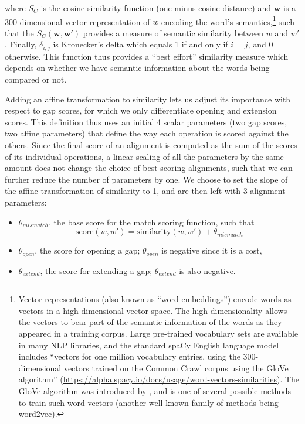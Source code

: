 where \(S_C\) is the cosine similarity function (one minus cosine
distance) and \(\bm{w}\) is a 300-dimensional vector representation of
\(w\) encoding the word's semantics,\footnote{Vector representations
  (also known as \enquote{word embeddings}) encode words as vectors in a
  high-dimensional vector space. The high-dimensionality allows the
  vectors to bear part of the semantic information of the words as they
  appeared in a training corpus. Large pre-trained vocabulary sets are
  available in many NLP libraries, and the standard spaCy English
  language model includes \enquote{vectors for one million vocabulary
  entries, using the 300-dimensional vectors trained on the Common Crawl
  corpus using the GloVe algorithm}
  (\url{https://alpha.spacy.io/docs/usage/word-vectors-similarities}).
  The GloVe algorithm was introduced by
  \textcite{pennington_glove:_2014}, and is one of several possible
  methods to train such word vectors (another well-known family of
  methods being word2vec).} such that the \(S_C(\bm{w}, \bm{w}')\)
provides a measure of semantic similarity between \(w\) and \(w'\).
Finally, \(\delta_{i,j}\) is Kronecker's delta which equals 1 if and
only if \(i = j\), and 0 otherwise. This function thus provides a
\enquote{best effort} similarity measure which depends on whether we
have semantic information about the words being compared or not.

Adding an affine transformation to similarity lets us adjust its
importance with respect to gap scores, for which we only differentiate
opening and extension scores. This definition thus uses an initial 4
scalar parameters (two gap scores, two affine parameters) that define
the way each operation is scored against the others. Since the final
score of an alignment is computed as the sum of the scores of its
individual operations, a linear scaling of all the parameters by the
same amount does not change the choice of best-scoring alignments, such
that we can further reduce the number of parameters by one. We choose to
set the slope of the affine transformation of similarity to 1, and are
then left with 3 alignment parameters:

\begin{itemize}
\item
  \(\theta_{mismatch}\), the base score for the match scoring function,
  such that
  \[\text{score}(w, w') = \text{similarity}(w, w') + \theta_{mismatch}\]
\item
  \(\theta_{open}\), the score for opening a gap; \(\theta_{open}\) is
  negative since it is a cost,
\item
  \(\theta_{extend}\), the score for extending a gap;
  \(\theta_{extend}\) is also negative.
\end{itemize}

